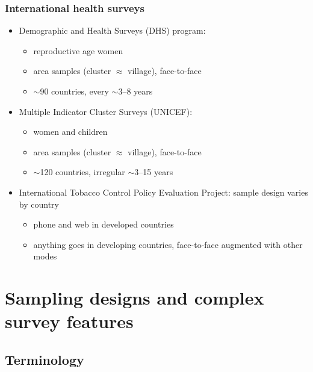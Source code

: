 \documentclass{beamer}
\begin{document}
\begin{frame}\frametitle{International health surveys}

\begin{itemize}
    \item Demographic and Health Surveys (DHS) program:
    \begin{itemize}
        \item reproductive age women
        \item area samples (cluster $\approx$ village), face-to-face
        \item $\sim$90 countries, every $\sim$3--8 years
    \end{itemize}
    \item Multiple Indicator Cluster Surveys (UNICEF):
    \begin{itemize}
        \item women and children
        \item area samples (cluster $\approx$ village), face-to-face
        \item $\sim$120 countries, irregular $\sim$3--15 years
    \end{itemize}
    \item International Tobacco Control Policy Evaluation Project: sample design varies by country
    \begin{itemize}
        \item phone and web in developed countries
        \item anything goes in developing countries, face-to-face augmented with other modes
    \end{itemize}
\end{itemize}

\end{frame}

\section{Sampling designs and complex survey features}

\subsection{Terminology}
\end{document}
